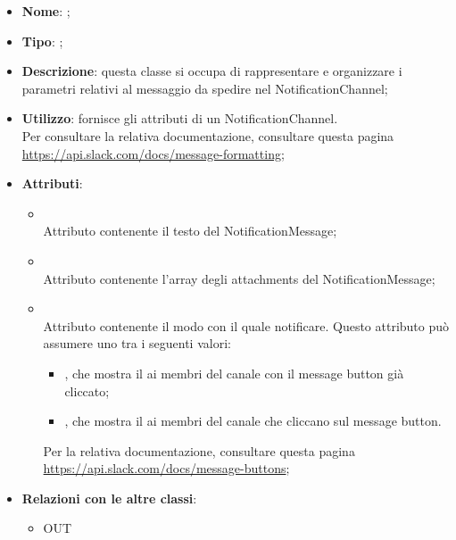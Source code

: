 \begin{itemize}
	\item \textbf{Nome}: ;
	\item \textbf{Tipo}: ;
	\item \textbf{Descrizione}: questa classe si occupa di rappresentare e organizzare i parametri relativi al messaggio da spedire nel NotificationChannel;
	\item \textbf{Utilizzo}: fornisce gli attributi di un NotificationChannel. \\ Per consultare la relativa documentazione, consultare questa pagina \url{https://api.slack.com/docs/message-formatting};
	\item \textbf{Attributi}:
	\begin{itemize}
		\item[]  \\
		Attributo contenente il testo del NotificationMessage;
		\item[]  \\
		Attributo contenente l'array degli attachments del NotificationMessage;
		\item[]  \\
		Attributo contenente il modo con il quale notificare.
Questo attributo può assumere uno tra i seguenti valori:
\begin{itemize}
\item {}, che mostra il  ai membri del canale con il message button già cliccato;
\item {}, che mostra il  ai membri del canale che cliccano sul message button.
\end{itemize}
Per la relativa documentazione, consultare questa pagina \url{https://api.slack.com/docs/message-buttons};
	\end{itemize}
	\item \textbf{Relazioni con le altre classi}:
	\begin{itemize}
		\item OUT \hyperlink{Attachment_label}{}
	\end{itemize}
\end{itemize}
\FloatBarrier

